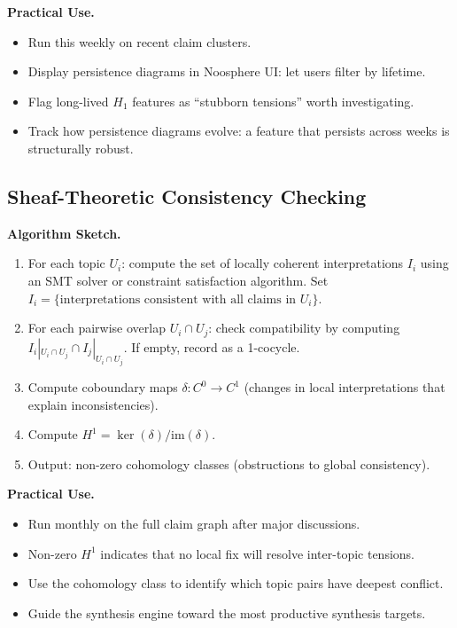 \documentclass[11pt,letterpaper]{article}
\theoremstyle{definition}
\theoremstyle{remark}
\begin{document}
\textbf{Practical Use.}
\begin{itemize}
\item Run this weekly on recent claim clusters.
\item Display persistence diagrams in Noosphere UI: let users filter by lifetime.
\item Flag long-lived $H_1$ features as ``stubborn tensions'' worth investigating.
\item Track how persistence diagrams evolve: a feature that persists across weeks is structurally robust.
\end{itemize}

\subsection{Sheaf-Theoretic Consistency Checking}

\textbf{Algorithm Sketch.}

\begin{enumerate}
\item For each topic $U_i$: compute the set of locally coherent interpretations $I_i$ using an SMT solver or constraint satisfaction algorithm. Set $I_i = \{\text{interpretations consistent with all claims in } U_i\}$.
\item For each pairwise overlap $U_i \cap U_j$: check compatibility by computing $I_i|_{U_i \cap U_j} \cap I_j|_{U_i \cap U_j}$. If empty, record as a 1-cocycle.
\item Compute coboundary maps $\delta: C^0 \to C^1$ (changes in local interpretations that explain inconsistencies).
\item Compute $H^1 = \ker(\delta) / \mathrm{im}(\delta)$.
\item Output: non-zero cohomology classes (obstructions to global consistency).
\end{enumerate}

\textbf{Practical Use.}
\begin{itemize}
\item Run monthly on the full claim graph after major discussions.
\item Non-zero $H^1$ indicates that no local fix will resolve inter-topic tensions.
\item Use the cohomology class to identify which topic pairs have deepest conflict.
\item Guide the synthesis engine toward the most productive synthesis targets.
\end{itemize}
\end{document}
